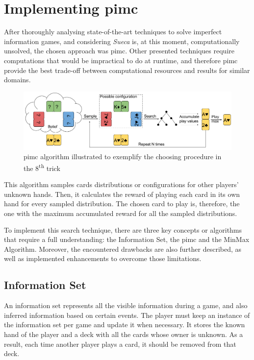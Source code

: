 \section{Implementing \ac{pimc}}
\label{sec:implementing}

After thoroughly analysing state-of-the-art techniques to solve imperfect information games, and considering \emph{Sueca} is, at this moment, computationally unsolved, the chosen approach was \ac{pimc}.
Other presented techniques require computations that would be impractical to do at runtime, and therefore \ac{pimc} provide the best trade-off between computational resources and results for similar domains.

\begin{figure}[h!]
  \centering
    \includegraphics[width=1\textwidth]{./img/4/PIMC}
  \caption{\ac{pimc} algorithm illustrated to exemplify the choosing procedure in the 8\textsuperscript{th} trick}
\label{fig:fitHistABC}
\end{figure}

This algorithm samples cards distributions or configurations for other players' unknown hands.
Then, it calculates the reward of playing each card in its own hand for every sampled distribution.
The chosen card to play is, therefore, the one with the maximum accumulated reward for all the sampled distributions.

To implement this search technique, there are three key concepts or algorithms that require a full understanding: the Information Set, the \ac{pimc} and the MinMax Algorithm.
Moreover, the encountered drawbacks are also further described, as well as implemented enhancements to overcome those limitations.


\subsection{Information Set}
An information set represents all the visible information during a game, and also inferred information based on certain events.
The player must keep an instance of the information set per game and update it when necessary.
It stores the known hand of the player and a deck with all the cards whose owner is unknown.
As a result, each time another player plays a card, it should be removed from that deck.

